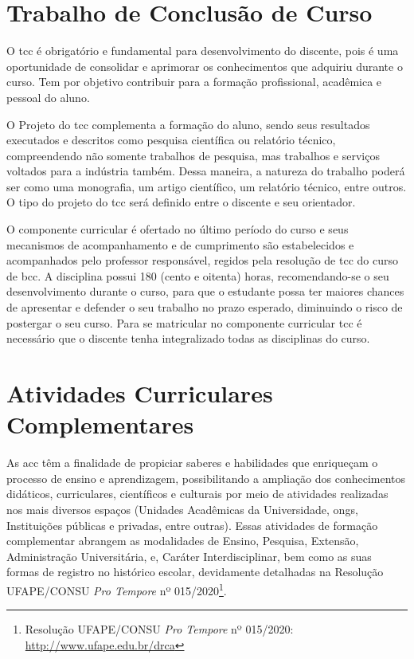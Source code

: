 \documentclass[
	12pt,				%
	openright,			%
  oneside,     %
	a4paper,			%
 hyphens,
	chapter=TITLE,		%
	english,			%
	french,				%
	spanish,			%
	brazil				%
	]{abntex2}
\begin{document}
\chapter{Trabalho de Conclusão de Curso}

O \acrfull{tcc} é obrigatório e fundamental para desenvolvimento do discente, pois é uma oportunidade de consolidar e aprimorar os conhecimentos que adquiriu durante o curso. Tem por objetivo contribuir para a formação profissional, acadêmica e pessoal do aluno.

O Projeto do \acrshort{tcc} complementa a formação do aluno, sendo seus resultados executados e descritos como pesquisa científica ou relatório técnico, compreendendo não somente trabalhos de pesquisa, mas trabalhos e serviços voltados para a indústria também.  Dessa maneira, a natureza do trabalho poderá ser como uma monografia, um artigo científico, um relatório técnico, entre outros. O tipo do projeto do \acrshort{tcc} será definido entre o discente e seu orientador.

O componente curricular é ofertado no último período do curso e seus mecanismos de acompanhamento e de cumprimento são estabelecidos e acompanhados pelo professor responsável, regidos pela resolução de \acrshort{tcc} do curso de \acrshort{bcc}. A disciplina possui 180 (cento e oitenta) horas, recomendando-se o seu desenvolvimento durante o curso, para que o estudante possa ter maiores chances de apresentar e defender o seu trabalho no prazo esperado, diminuindo o risco de postergar o seu curso. Para se matricular no componente curricular \acrshort{tcc} é necessário que o discente tenha integralizado todas as disciplinas do curso.






%
%




\chapter{Atividades Curriculares Complementares}

As \acrfull{acc} têm a finalidade de propiciar saberes e habilidades que enriqueçam o processo de ensino e aprendizagem, possibilitando a ampliação dos conhecimentos didáticos, curriculares, científicos e culturais por meio de atividades realizadas nos mais diversos espaços (Unidades Acadêmicas da Universidade, \acrfull{ongs}, Instituições públicas e privadas, entre outras). Essas atividades de formação complementar abrangem as modalidades de Ensino, Pesquisa, Extensão, Administração Universitária, e, Caráter Interdisciplinar, bem como as suas formas de registro no histórico escolar, devidamente detalhadas na Resolução UFAPE/CONSU \textit{Pro Tempore} nº 015/2020\footnote{Resolução UFAPE/CONSU \textit{Pro Tempore} nº 015/2020: \url{http://www.ufape.edu.br/drca}}. 
\end{document}
